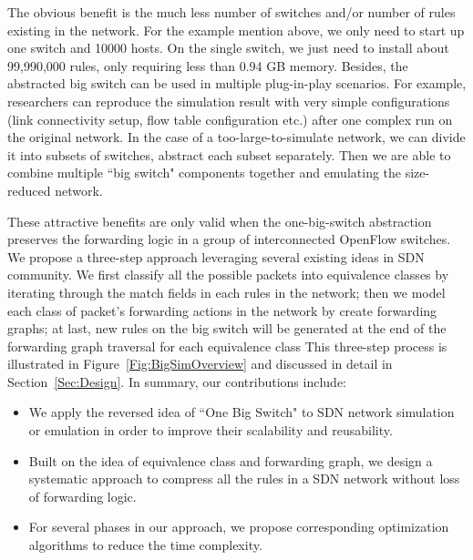 The obvious benefit is the much less number of switches and/or number of rules existing in the network.
For the example mention above, we only need to start up one switch and 10000 hosts.
On the single switch, we just need to install about 99,990,000 rules, only requiring less than 0.94 GB memory.
Besides, the abstracted big switch can be used in multiple plug-in-play scenarios.
For example, researchers can reproduce the simulation result with very
simple configurations (link connectivity setup, flow table configuration etc.)
after one complex run on the original network.
In the case of a too-large-to-simulate network, we can divide it into subsets of switches,
abstract each subset separately.
Then we are able to combine multiple ``big switch" components together
and emulating the size-reduced network.

These attractive benefits are only valid when the one-big-switch abstraction preserves
the forwarding logic in a group of interconnected OpenFlow switches.
We propose a three-step approach leveraging several existing ideas in SDN community.
We first classify all the possible packets into equivalence classes by iterating through
the match fields in each rules in the network;
then we model each class of packet's forwarding actions in the network
by create forwarding graphs;
at last, new rules on the big switch will be generated at the end of the 
forwarding graph traversal for each equivalence class
This three-step process is illustrated in Figure~\ref{Fig:BigSimOverview} and discussed
in detail in Section~\ref{Sec:Design}.
In summary, our contributions include:
\begin{itemize}
\item We apply the reversed idea of ``One Big Switch"\cite{OneBigSwitchAbstraction}
        to SDN network simulation or emulation in order to
        improve their scalability and reusability.
\item Built on the idea of equivalence class and forwarding graph, we design
        a systematic approach to compress all the rules in a SDN network without
        loss of forwarding logic.
\item For several phases in our approach, we propose corresponding optimization
        algorithms to reduce the time complexity.
\end{itemize}

